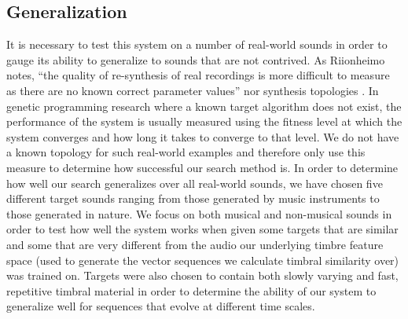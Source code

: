 \documentclass[12pt]{report} 	%
\numberwithin{figure}{chapter}
\numberwithin{table}{chapter}
\numberwithin{equation}{chapter}
\begin{document}
\begin{flushleft}
\vspace{12pt}\section{Generalization}
It is necessary to test this system on a number of real-world sounds in order to gauge its ability to generalize to sounds that are not contrived. As Riionheimo notes, ``the quality of re-synthesis of real recordings is more difficult to measure as there are no known correct parameter values'' nor synthesis topologies \cite[p. 13]{Riionheimo:2003qo}. In genetic programming research where a known target algorithm does not exist, the performance of the system is usually measured using the fitness level at which the system converges and how long it takes to converge to that level. We do not have a known topology for such real-world examples and therefore only use this measure to determine how successful our search method is. In order to determine how well our search generalizes over all real-world sounds, we have chosen five different target sounds ranging from those generated by music instruments to those generated in nature. We focus on both musical and non-musical sounds in order to test how well the system works when given some targets that are similar and some that are very different from the audio our underlying timbre feature space (used to generate the vector sequences we calculate timbral similarity over) was trained on. Targets were also chosen to contain both slowly varying and fast, repetitive timbral material in order to determine the ability of our system to generalize well for sequences that evolve at different time scales.


\end{flushleft}
\end{document}
